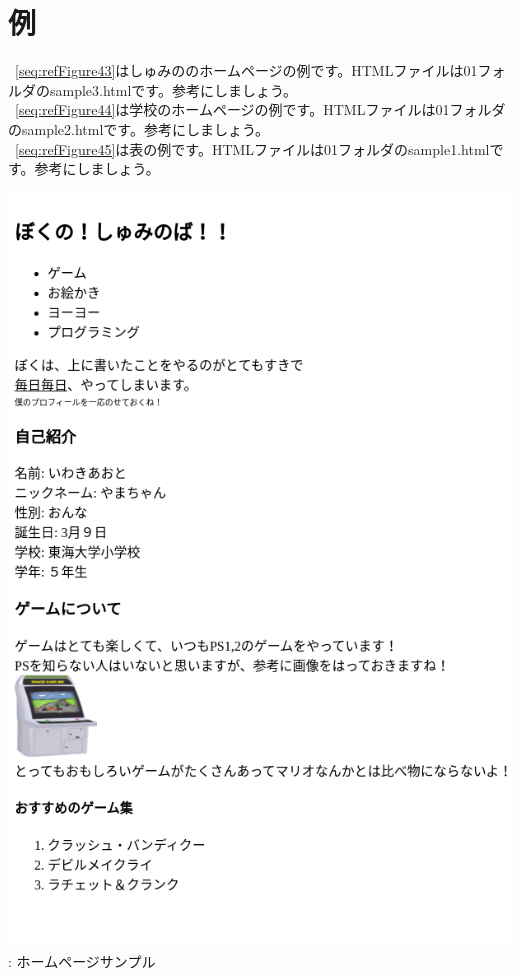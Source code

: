 \documentclass[a4paper,12pt]{jarticle}
\begin{document}
\section{例}
 {~\ref{seq:refFigure43}はしゅみののホームページの例です。HTMLファイルは01フォルダのsample3.htmlです。参考にしましょう。}\\
{~\ref{seq:refFigure44}は学校のホームページの例です。HTMLファイルは01フォルダのsample2.htmlです。参考にしましょう。}\\
{~\ref{seq:refFigure45}は表の例です。HTMLファイルは01フォルダのsample1.htmlです。参考にしましょう。}\\

\centering
\begin{minipage}{0.45\textwidth}
  {\upshape
    \includegraphics[width=0.9\linewidth]{textbook-img209.png}
    \newline
    {\theFigure\label{seq:refFigure43}}:
    ホームページサンプル}
\end{minipage}
\end{document}
